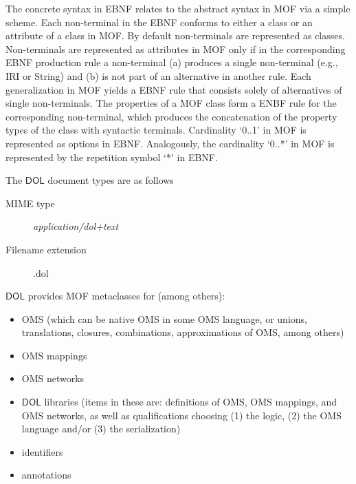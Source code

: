 \documentclass[10pt, a4paper]{isov2}
\newcommand{\red}[1]{#1} %
\newcommand*{\mimetype}[1]{\textit{#1}}
\newcommand*{\DOL}{\ensuremath{\mathsf{DOL}}\xspace}
\begin{document}
The concrete syntax in EBNF relates to the abstract syntax in MOF via a simple scheme. Each
 non-terminal in the EBNF conforms to either a class or an attribute of a class in MOF.
By default non-terminals are represented as classes. Non-terminals are represented as attributes in MOF
only if in the corresponding EBNF production rule a non-terminal (a) produces
a single non-terminal  (e.g., IRI or String) and
(b) is  not part of an alternative in another rule.
Each generalization in MOF yields a EBNF rule that
consists solely of alternatives of single non-terminals.
The properties of a MOF class form a ENBF rule for the corresponding non-terminal,
which produces the concatenation of the property types of the class with syntactic terminals.
Cardinality  `0..1' in MOF is  represented as options in EBNF.  Analogously, the cardinality
`0..*' in MOF is represented by the repetition symbol `*' in EBNF.

\medskip
The \DOL document types are as follows
		\begin{description}
			\item[MIME type] \mimetype{application/dol+text}
			\item[Filename extension] .dol
		\end{description}


\label{s:mof-metaclasses}

\DOL provides MOF metaclasses for (among others):
\begin{itemize}
\item OMS (which can be native OMS in some OMS language, or unions, translations,  closures, combinations, approximations of OMS, among others)
\item OMS mappings
\item OMS networks
\item \DOL libraries (items in these are: definitions of OMS, OMS mappings, and OMS networks, as well as qualifications choosing (1) the logic,
(2) the OMS language and/or (3) the serialization)
\item identifiers
\item annotations
\end{itemize}
\end{document}
